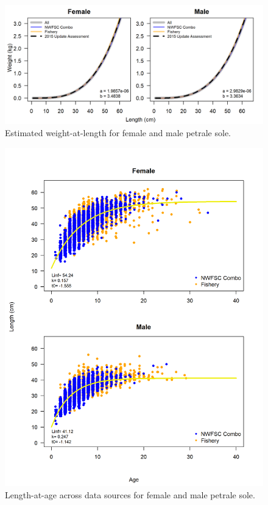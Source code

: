 \documentclass[12pt,]{article}
\begin{document}
\FloatBarrier

\begin{figure}
\centering
\includegraphics{Figures/weightAtLengthPred.png}
\caption{Estimated weight-at-length for female and male petrale sole.
\label{fig:wt_length}}
\end{figure}

\FloatBarrier

\begin{figure}
\centering
\includegraphics{Figures/LengthAgeAll.png}
\caption{Length-at-age across data sources for female and male petrale
sole. \label{fig:length_age}}
\end{figure}
\end{document}
